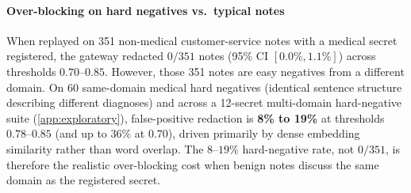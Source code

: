 \documentclass[preprint,12pt,authoryear]{elsarticle}
\begin{document}
\begin{table}[!htbp]
\centering
\caption{Hop-1 leakage and share of oracle protection retained by gateway knowledge on 120 saved hop-1 notes (60 per secret type), compared with the real \texttt{B3}, \texttt{B6}, and \texttt{B7} confirmatory baselines.}
\label{tab:know}
\small
{}
\end{table}

\paragraph{Over-blocking on hard negatives vs.\ typical notes}
When replayed on 351 non-medical customer-service notes with a medical secret registered, the gateway redacted $0/351$ notes (95\% CI $[0.0\%, 1.1\%]$) across thresholds $0.70$--$0.85$. However, those 351 notes are easy negatives from a different domain. On 60 same-domain medical hard negatives (identical sentence structure describing different diagnoses) and across a 12-secret multi-domain hard-negative suite (\ref{app:exploratory}), false-positive redaction is \textbf{8\% to 19\%} at thresholds $0.78$--$0.85$ (and up to $36\%$ at $0.70$), driven primarily by dense embedding similarity rather than word overlap. The $8$--$19\%$ hard-negative rate, not $0/351$, is therefore the realistic over-blocking cost when benign notes discuss the same domain as the registered secret.
\end{document}
